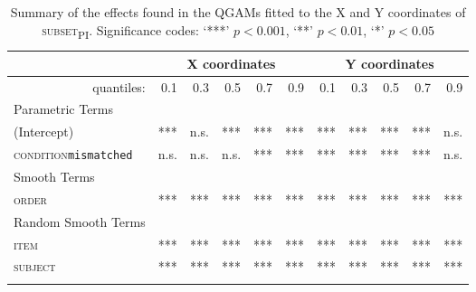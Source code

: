 \begin{table}[H]\fontsize{9}{10}
\caption{Summary of the effects found in the QGAMs fitted to the X and Y coordinates of \textsc{subset\textsubscript{PI}}. Significance codes: `***' $p < 0.001$, `**' $p < 0.01$, `*' $p < 0.05$}
\label{tab:8.8}
\centering
\begin{tabular}{lrrrrrrrrrr}
\lsptoprule
~                   & \multicolumn{5}{c}{X coordinates}                              & \multicolumn{5}{c}{Y coordinates}                               \\
\midrule
\multicolumn{1}{r}{quantiles:}          & 0.1        & 0.3        & 0.5        & 0.7        & 0.9        & 0.1        & 0.3        & 0.5        & 0.7        & 0.9         \\
\midrule
Parametric Terms    & \textbf{~} & \textbf{~} & \textbf{~} & \textbf{~} & \textbf{~} & \textbf{~} & \textbf{~} & \textbf{~} & \textbf{~} & \textbf{~}  \\
\midrule
(Intercept)         & ***        & n.s.         & ***        & ***        & ***        & ***        & ***        & ***        & ***        & n.s.          \\
\textsc{condition}\texttt{mismatched} & n.s.       & n.s.          & n.s.        & ***        & ***        & ***       & ***        & ***        & ***        & n.s.         \\
\midrule
Smooth Terms        & \textbf{~} & \textbf{~} & \textbf{~} & \textbf{~} & \textbf{~} & \textbf{~} & \textbf{~} & \textbf{~} & \textbf{~} & \textbf{~}  \\
\midrule
\textsc{order}               & ***        & ***        & ***        & ***        & ***        & ***        & ***        & ***        & ***        & ***         \\
\midrule
Random Smooth Terms & \textbf{~} & \textbf{~} & \textbf{~} & \textbf{~} & \textbf{~} & \textbf{~} & \textbf{~} & \textbf{~} & \textbf{~} & \textbf{~}  \\
\midrule
\textsc{item}                & ***        & ***        & ***        & ***        & ***        & ***        & ***        & ***        & ***        & ***         \\
\textsc{subject}             & ***        & ***        & ***        & ***        & ***        & ***        & ***        & ***        & ***        & ***        \\
\lspbottomrule
\end{tabular}
\end{table}





